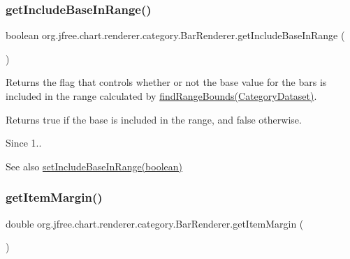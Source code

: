 \subsubsection{\texorpdfstring{get\+Include\+Base\+In\+Range()}{getIncludeBaseInRange()}}
{\footnotesize\ttfamily boolean org.\+jfree.\+chart.\+renderer.\+category.\+Bar\+Renderer.\+get\+Include\+Base\+In\+Range (\begin{DoxyParamCaption}{ }\end{DoxyParamCaption})}

Returns the flag that controls whether or not the base value for the bars is included in the range calculated by \mbox{\hyperlink{classorg_1_1jfree_1_1chart_1_1renderer_1_1category_1_1_abstract_category_item_renderer_aba6ace35854f96515fecf819b4fa20f7}{find\+Range\+Bounds(\+Category\+Dataset)}}.

\begin{DoxyReturn}{Returns}
{\ttfamily true} if the base is included in the range, and {\ttfamily false} otherwise.
\end{DoxyReturn}
\begin{DoxySince}{Since}
1..
\end{DoxySince}
\begin{DoxySeeAlso}{See also}
\mbox{\hyperlink{classorg_1_1jfree_1_1chart_1_1renderer_1_1category_1_1_bar_renderer_a98fdf75331a25f3c7a2197a3b1d0a055}{set\+Include\+Base\+In\+Range(boolean)}} 
\end{DoxySeeAlso}
\mbox{\label{classorg_1_1jfree_1_1chart_1_1renderer_1_1category_1_1_bar_renderer_aea515b299aef9bd050aa0a633abd25aa}} 
\subsubsection{\texorpdfstring{get\+Item\+Margin()}{getItemMargin()}}
{\footnotesize\ttfamily double org.\+jfree.\+chart.\+renderer.\+category.\+Bar\+Renderer.\+get\+Item\+Margin (\begin{DoxyParamCaption}{ }\end{DoxyParamCaption})}


